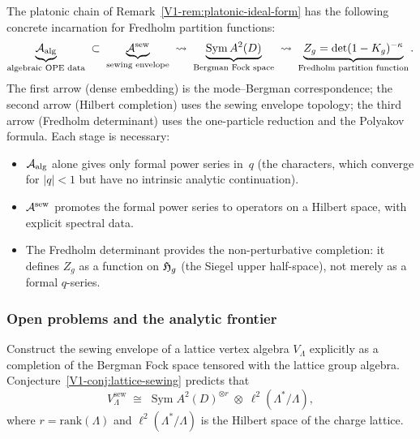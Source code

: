 \begin{remark}%
%
The platonic chain of Remark~\ref{V1-rem:platonic-ideal-form}
has the following concrete incarnation for Fredholm partition
functions:
\[
\underbrace{\mathcal{A}_{\mathrm{alg}}}_{\text{algebraic OPE data}}
\;\subset\;
\underbrace{\mathcal{A}^{\mathrm{sew}}}_{\text{sewing envelope}}
\;\rightsquigarrow\;
\underbrace{\operatorname{Sym} A^2(D)}_{\text{Bergman Fock space}}
\;\rightsquigarrow\;
\underbrace{Z_g = \det(1 - K_g)^{-\kappa}}_{\text{Fredholm
partition function}}.
\]
The first arrow (dense embedding) is the mode--Bergman
correspondence; the second arrow (Hilbert completion) uses
the sewing envelope topology; the third arrow (Fredholm
determinant) uses the one-particle reduction and the
Polyakov formula.
Each stage is necessary:
\begin{itemize}
\item $\mathcal{A}_{\mathrm{alg}}$ alone gives only formal power series in~$q$
 (the characters, which converge for $|q| < 1$ but have no
 intrinsic analytic continuation).
\item $\mathcal{A}^{\mathrm{sew}}$ promotes the formal power series to operators
 on a Hilbert space, with explicit spectral data.
\item The Fredholm determinant provides the non-perturbative
 completion: it defines $Z_g$ as a function on $\mathfrak{H}_g$
 (the Siegel upper half-space), not merely as a formal
 $q$-series.
\end{itemize}
\end{remark}

\subsubsection{Open problems and the analytic frontier}

\begin{openproblem}%
%
Construct the sewing envelope of a lattice vertex algebra
$V_\Lambda$ explicitly as a completion of the Bergman Fock
space tensored with the lattice group algebra.
Conjecture~\textup{\ref{V1-conj:lattice-sewing}} predicts that
\begin{equation}%
V_\Lambda^{\mathrm{sew}}
\;\cong\;
\operatorname{Sym} A^2(D)^{\otimes r}
\;\otimes\;
\ell^2(\Lambda^*/\Lambda),
\end{equation}
where $r = \mathrm{rank}(\Lambda)$ and
$\ell^2(\Lambda^*/\Lambda)$ is the Hilbert space of the
charge lattice.
\end{openproblem}

